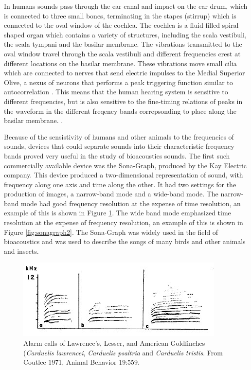 \documentclass[12pt,oneside]{book}
\begin{document}
In humans sounds pass through the ear canal and impact on the ear
drum, which is connected to three small bones, terminating in the
stapes (stirrup) which is connected to the oval window of the cochlea.
The cochlea is a fluid-filled spiral shaped organ which contains a
variety of structures, including the scala vestibuli, the scala
tympani and the basilar membrane.  The vibrations transmitted to the
oval window travel through the scala vestibuli and different
frequencies crest at different locations on the basilar membrane.
These vibrations move small cilia which are connected to nerves that
send electric impulses to the Medial Superior Olive, a nexus of
neurons that performs a peak triggering function similar to
autocorrelation \cite{lyon10}.  This means that the human hearing
system is sensitive to different frequencies, but is also sensitive to
the fine-timing relations of peaks in the waveform in the different
freqency bands correpsonding to place along the basilar membrane.
\cite{waltersphd}.

Because of the sensistivity of humans and other animals to the
frequencies of sounds, devices that could separate sounds into their
characteristic frequency bands proved very useful in the study of
bioacoustics sounds.  The first such commercially available device was
the Sona-Graph, produced by the Kay Electric company.  This device
produced a two-dimensional representation of sound, with frequency
along one axis and time along the other.  It had two settings for the
production of images, a narrow-band mode and a wide-band mode.  The
narrow-band mode had good frequency resolution at the expense of time
resolution, an example of this is shown in Figure
\ref{fig:sonagraph1}.  The wide band mode emphasized time resolution
at the expense of frequency resolution, an example of this is shown in
Figure \ref{fig:sonagraph2}.  The Sona-Graph was widely used in the
field of bioacoustics and was used to describe the songs of many birds
and other animals and insects.

\begin{figure}[t]
\centering
\includegraphics[width=\columnwidth]{figures/sonagraph1}
\caption{Alarm calls of Lawrence's, Lesser, and American Goldfinches
  (\textit{Carduelis lawrencei}, \textit{Carduelis psaltria} and
  \textit{Carduelis tristis}. From Coutlee 1971, Animal Behavior
  19:559.}
\label{fig:sonagraph1}
\end{figure}
\end{document}
